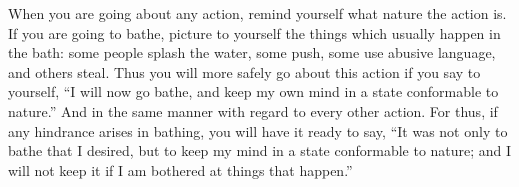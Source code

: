 When you are going about any action, remind yourself what nature the action is.
If you are going to bathe, picture  to yourself the things which usually happen
in  the  bath: some  people  splash  the water,  some  push,  some use  abusive
language, and others steal.  Thus you will more safely go  about this action if
you say  to yourself, ``I will  now go bathe, and  keep my own mind  in a state
conformable to  nature.'' And  in the  same manner with  regard to  every other
action. For thus, if any hindrance arises in bathing, you will have it ready to
say, ``It was not only to bathe that I  desired, but to keep my mind in a state
conformable to nature; and  I will not keep it if I am  bothered at things that
happen.''
